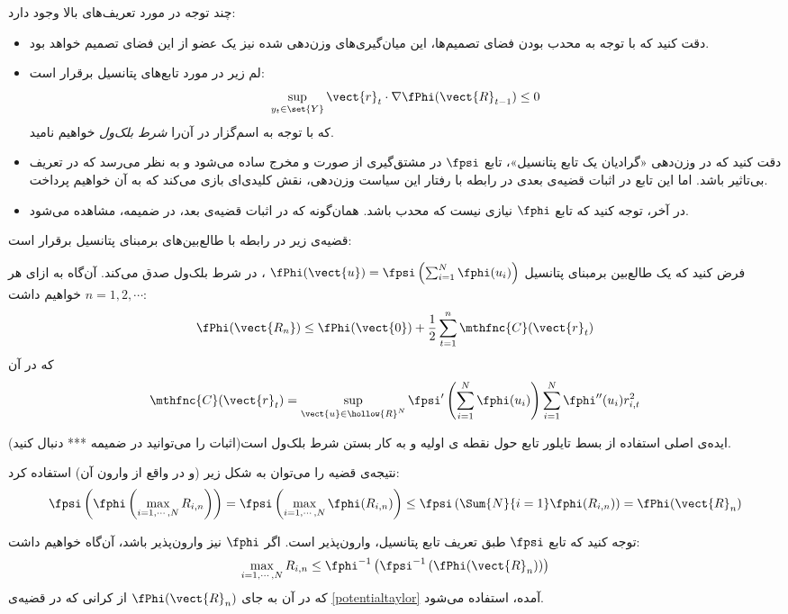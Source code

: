 چند توجه در مورد تعریف‌های بالا وجود دارد:
\begin{itemize}
\item 
دقت کنید که با توجه به محدب بودن فضای تصمیم‌ها، این میان‌گیری‌های وزن‌دهی شده نیز یک عضو از این فضای تصمیم خواهد بود.
\item 
لم زیر در مورد تابع‌های پتانسیل برقرار است:
\[
\sup_{y_t \in \set{Y}} \vect{r}_t \cdot \nabla \fPhi( \vect{R}_{t-1} ) \leq 0
\]
که با توجه به اسم‌گزار در 
\cite{asdsda} 
آن‌را 
\textit{
شرط بلک‌ول
} 
خواهیم نامید.

\item 
دقت کنید که در وزن‌دهی «گرادیان یک تابع پتانسیل»، تابع 
$\fpsi$ 
در مشتق‌گیری از صورت و مخرج ساده می‌شود و به نظر می‌رسد که در تعریف بی‌تاثیر باشد. اما این تابع در اثبات قضیه‌ی بعدی در رابطه با رفتار این سیاست وزن‌دهی، نقش کلیدی‌ای بازی می‌کند که به آن خواهیم پرداخت.

\item 
در آخر، توجه کنید که تابع 
$\fphi$ 
نیازی نیست که محدب باشد. همان‌گونه که در اثبات قضیه‌ی بعد، در ضمیمه، مشاهده می‌شود.
\end{itemize}

قضیه‌ی زیر در رابطه با طالع‌بین‌های برمبنای پتانسیل برقرار است:
\begin{theorem}
\label{potentialtaylor}
فرض کنید که یک طالع‌بین برمبنای پتانسیل 
$\fPhi( \vect{u} ) = \fpsi \left( \sum^{N}_{i=1} \fphi( u_i ) \right)$
، در شرط بلک‌ول صدق می‌کند. آن‌گاه به ازای هر 
$n = 1,2, \cdots$ 
خواهیم داشت:
\[
\fPhi( \vect{R_n} ) \leq \fPhi( \vect{0} ) + \frac{1}{2} \sum^{n}_{t=1} \mthfnc{C}( \vect{r}_t )
\]
که در آن
\[
\mthfnc{C}( \vect{r}_t ) = \sup_{ \vect{u} \in \hollow{R}^N } \fpsi^\prime \left( \sum^{N}_{i=1} \fphi( u_i ) \right) \sum^{N}_{i=1} \fphi^{\prime\prime} (u_i) r^{2}_{i,t}
\]
\end{theorem}

ایده‌ی اصلی استفاده از بسط تایلور تابع حول نقطه ی اولیه و به کار بستن شرط بلک‌ول است(اثبات را می‌توانید در ضمیمه *** دنبال کنید).

نتیجه‌ی قضیه را می‌توان به شکل زیر (و در واقع از وارون آن) استفاده کرد:
\[
\fpsi \left( \fphi \left( \max_{i=1,\cdots,N} R_{i,n} \right) \right) = \fpsi \left( \max_{i=1,\cdots,N} \fphi (R_{i,n}) \right) \leq \fpsi \left( \Sum{N}{i=1} \fphi (R_{i,n}) \right) = \fPhi( \vect{R}_n )
\]

توجه کنید که تابع 
$\fpsi$ 
طبق تعریف تابع پتانسیل، وارون‌پذیر است. اگر 
$\fphi$ 
نیز وارون‌پذیر باشد، آن‌گاه خواهیم داشت:
\[
\max_{i=1,\cdots,N} R_{i,n} \leq \fphi^{-1} \left( \fpsi^{-1} \left( \fPhi( \vect{R}_n ) \right) \right)
\]
که در آن به جای 
$\fPhi (\vect{R}_n)$ 
از کرانی که در قضیه‌ی 
\ref{potentialtaylor} 
آمده، استفاده می‌شود.

